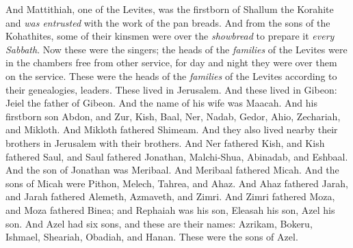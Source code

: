 \begin{biblechapter}
\verse And Mattithiah, one of the Levites, was the firstborn of Shallum the Korahite and \textit{was entrusted} with the work of the pan breads.
\verse And from the sons of the Kohathites, some of their kinsmen were over the \textit{showbread} to prepare it \textit{every Sabbath}.
\verse Now these were the singers; the heads of the \textit{families} of the Levites were in the chambers free from other service, for day and night they were over them on the service.
\verse These were the heads of the \textit{families} of the Levites according to their genealogies, leaders. These lived in Jerusalem.
 And these lived in Gibeon: Jeiel the father of Gibeon. And the name of his wife was Maacah.
\verse And his firstborn son Abdon, and Zur, Kish, Baal, Ner, Nadab,
\verse Gedor, Ahio, Zechariah, and Mikloth.
\verse And Mikloth fathered Shimeam. And they also lived nearby their brothers in Jerusalem with their brothers.
\verse And Ner fathered Kish, and Kish fathered Saul, and Saul fathered Jonathan, Malchi-Shua, Abinadab, and Eshbaal.
\verse And the son of Jonathan was Meribaal. And Meribaal fathered Micah.
\verse And the sons of Micah were Pithon, Melech, Tahrea, and Ahaz.
\verse And Ahaz fathered Jarah, and Jarah fathered Alemeth, Azmaveth, and Zimri. And Zimri fathered Moza,
\verse and Moza fathered Binea; and Rephaiah was his son, Eleasah his son, Azel his son.
\verse And Azel had six sons, and these are their names: Azrikam, Bokeru, Ishmael, Sheariah, Obadiah, and Hanan. These were the sons of Azel.
\end{biblechapter}


